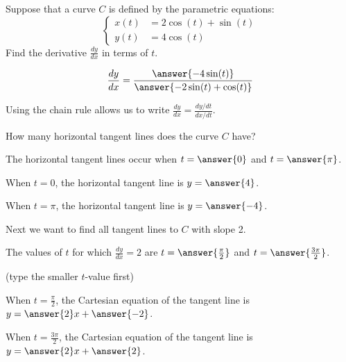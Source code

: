\documentclass{ximera}
\author{Jim Talamo and Alex Beckwith}
\begin{document}
\begin{exercise}

Suppose that a curve $C$ is defined by the parametric equations:
\[
\begin{cases}
x(t) &= 2\cos(t)+\sin(t) \\
y(t) &= 4\cos(t)
\end{cases}
\]
Find the derivative $\frac{dy}{dx}$ in terms of $t$.

\[
\frac{dy}{dx} = \frac{\answer{-4\sin(t)}}{\answer{-2\sin(t)+\cos(t)}}
\]

\begin{hint}
Using the chain rule allows us to write $\frac{dy}{dx} = \frac{dy/dt}{dx/dt}$.
\end{hint}

\begin{exercise}
How many horizontal tangent lines does the curve $C$ have?
\begin{multipleChoice}
\end{multipleChoice}

The horizontal tangent lines occur when $t=\answer{0}$ and $t=\answer{\pi}$.

\begin{exercise}
When $t=0$, the horizontal tangent line is $y=\answer{4}$.

When $t=\pi$, the horizontal tangent line is $y=\answer{-4}$.
\end{exercise}
\end{exercise}

\begin{exercise}
Next we want to find all tangent lines to $C$ with slope 2. 

The values of $t$ for which $\frac{dy}{dx} =2$ are $t=\answer{\frac{\pi}{2}}$ and $t=\answer{\frac{3\pi}{2}}$.

(type the smaller $t$-value first)

\begin{exercise}
When $t=\frac{\pi}{2}$, the Cartesian equation of the tangent line is $y=\answer{2}x+\answer{-2}$.

When $t=\frac{3\pi}{2}$, the Cartesian equation of the tangent line is $y=\answer{2}x+\answer{2}$.
\end{exercise}
\end{exercise}


\end{exercise}
\end{document}
